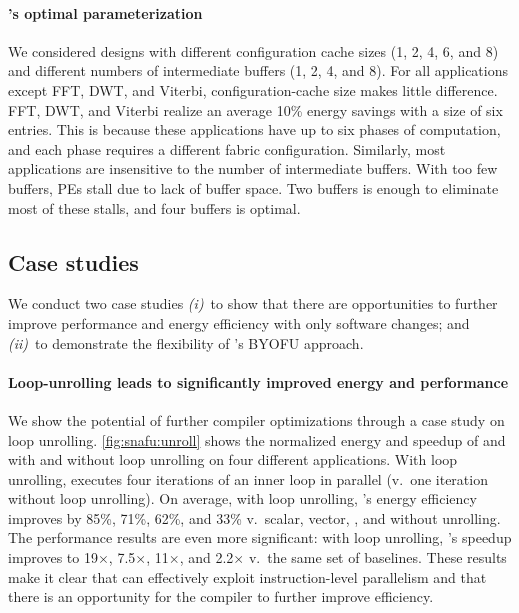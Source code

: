 \paragraph{\snafu's optimal parameterization}
We considered designs with different configuration cache sizes (1, 2, 4, 6, and 8) and different numbers of intermediate buffers (1, 2, 4, and 8).
% 
For all applications except FFT, DWT, and Viterbi, configuration-cache size makes little difference.
% 
FFT, DWT, and Viterbi realize an average 10\% energy savings with a size of six entries.
% 
This is because these applications have up to six phases of computation, and each phase requires a different fabric configuration.
%
Similarly, most applications are insensitive to the number of intermediate buffers.
%
With too few buffers, PEs stall due to lack of buffer space.
%
Two buffers is enough to eliminate most of these stalls, and four buffers is optimal. 

\figSNAFUSensUnrollResults

\subsection{Case studies}
We conduct two case studies \emph{(i)}~to show that there are opportunities to further improve performance and energy efficiency with only software changes; and \emph{(ii)}~to demonstrate the flexibility of \snafuframe's BYOFU approach.

\paragraph{Loop-unrolling leads to significantly improved energy and performance}
We show the potential of further compiler optimizations through a case study on loop unrolling.
%
\autoref{fig:snafu:unroll} shows the normalized energy and speedup of \manic and \snafuarch with and without loop unrolling on four different applications.
%
With loop unrolling, \snafuarch executes four iterations of an inner loop in parallel (v.\ one iteration without loop unrolling).
% 
On average, with loop unrolling, \snafuarch's energy efficiency improves by 85\%, 71\%, 62\%, and 33\% v.\ scalar, vector, \manic, and \snafuarch without unrolling.
% 
The performance results are even more significant: with loop unrolling, \snafuarch's speedup improves to 19$\times$, 7.5$\times$, 11$\times$, and 2.2$\times$ v.\
the same set of baselines.
%
These results make it clear that \snafuarch can effectively exploit instruction-level parallelism and that there is an opportunity for the compiler to further improve efficiency.

